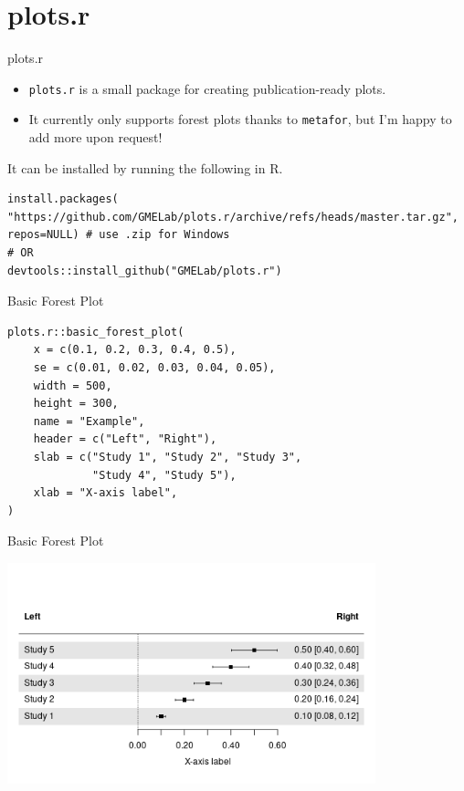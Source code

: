\documentclass[10pt,handout]{beamer}
\begin{document}
\section{plots.r}

\begin{frame}[fragile]{plots.r}
  \begin{itemize}[<+->]
    \item \texttt{plots.r} is a small package for creating publication-ready plots.
    \item It currently only supports forest plots thanks to \texttt{metafor}, but I'm happy to add more upon request!
  \end{itemize}
  \pause
  It can be installed by running the following in R.
  \begin{small}
  \begin{verbatim}
install.packages(
"https://github.com/GMELab/plots.r/archive/refs/heads/master.tar.gz",
repos=NULL) # use .zip for Windows
# OR
devtools::install_github("GMELab/plots.r")
\end{verbatim}
\end{small}
\end{frame}

\begin{frame}[fragile]{Basic Forest Plot}
  \begin{verbatim}
plots.r::basic_forest_plot(
    x = c(0.1, 0.2, 0.3, 0.4, 0.5),
    se = c(0.01, 0.02, 0.03, 0.04, 0.05),
    width = 500,
    height = 300,
    name = "Example",
    header = c("Left", "Right"),
    slab = c("Study 1", "Study 2", "Study 3",
             "Study 4", "Study 5"),
    xlab = "X-axis label",
)
\end{verbatim}
\end{frame}

\begin{frame}{Basic Forest Plot}
  \begin{center}
    \includegraphics[width=0.8\textwidth]{Example.png}
  \end{center}
\end{frame}
\end{document}
